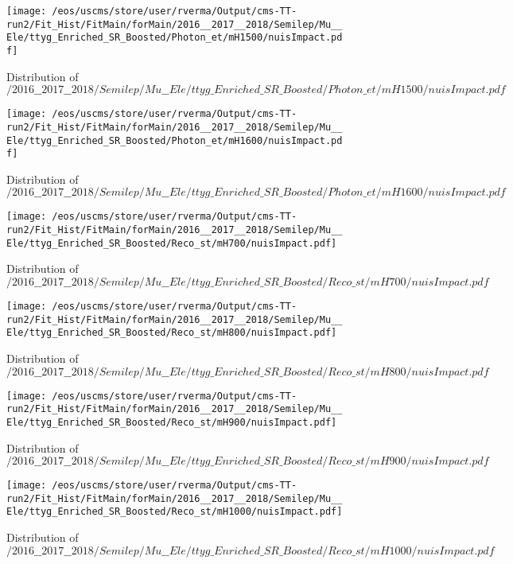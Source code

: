 \begin{figure}
\centering
\texttt{[image: /eos/uscms/store/user/rverma/Output/cms-TT-run2/Fit\_Hist/FitMain/forMain/2016\_\_2017\_\_2018/Semilep/Mu\_\_Ele/ttyg\_Enriched\_SR\_Boosted/Photon\_et/mH1500/nuisImpact.pdf]}
\caption{Distribution of $/2016\_\_2017\_\_2018/Semilep/Mu\_\_Ele/ttyg\_Enriched\_SR\_Boosted/Photon\_et/mH1500/nuisImpact.pdf$}
\end{figure}

\begin{figure}
\centering
\texttt{[image: /eos/uscms/store/user/rverma/Output/cms-TT-run2/Fit\_Hist/FitMain/forMain/2016\_\_2017\_\_2018/Semilep/Mu\_\_Ele/ttyg\_Enriched\_SR\_Boosted/Photon\_et/mH1600/nuisImpact.pdf]}
\caption{Distribution of $/2016\_\_2017\_\_2018/Semilep/Mu\_\_Ele/ttyg\_Enriched\_SR\_Boosted/Photon\_et/mH1600/nuisImpact.pdf$}
\end{figure}

\begin{figure}
\centering
\texttt{[image: /eos/uscms/store/user/rverma/Output/cms-TT-run2/Fit\_Hist/FitMain/forMain/2016\_\_2017\_\_2018/Semilep/Mu\_\_Ele/ttyg\_Enriched\_SR\_Boosted/Reco\_st/mH700/nuisImpact.pdf]}
\caption{Distribution of $/2016\_\_2017\_\_2018/Semilep/Mu\_\_Ele/ttyg\_Enriched\_SR\_Boosted/Reco\_st/mH700/nuisImpact.pdf$}
\end{figure}

\begin{figure}
\centering
\texttt{[image: /eos/uscms/store/user/rverma/Output/cms-TT-run2/Fit\_Hist/FitMain/forMain/2016\_\_2017\_\_2018/Semilep/Mu\_\_Ele/ttyg\_Enriched\_SR\_Boosted/Reco\_st/mH800/nuisImpact.pdf]}
\caption{Distribution of $/2016\_\_2017\_\_2018/Semilep/Mu\_\_Ele/ttyg\_Enriched\_SR\_Boosted/Reco\_st/mH800/nuisImpact.pdf$}
\end{figure}

\begin{figure}
\centering
\texttt{[image: /eos/uscms/store/user/rverma/Output/cms-TT-run2/Fit\_Hist/FitMain/forMain/2016\_\_2017\_\_2018/Semilep/Mu\_\_Ele/ttyg\_Enriched\_SR\_Boosted/Reco\_st/mH900/nuisImpact.pdf]}
\caption{Distribution of $/2016\_\_2017\_\_2018/Semilep/Mu\_\_Ele/ttyg\_Enriched\_SR\_Boosted/Reco\_st/mH900/nuisImpact.pdf$}
\end{figure}

\begin{figure}
\centering
\texttt{[image: /eos/uscms/store/user/rverma/Output/cms-TT-run2/Fit\_Hist/FitMain/forMain/2016\_\_2017\_\_2018/Semilep/Mu\_\_Ele/ttyg\_Enriched\_SR\_Boosted/Reco\_st/mH1000/nuisImpact.pdf]}
\caption{Distribution of $/2016\_\_2017\_\_2018/Semilep/Mu\_\_Ele/ttyg\_Enriched\_SR\_Boosted/Reco\_st/mH1000/nuisImpact.pdf$}
\end{figure}

